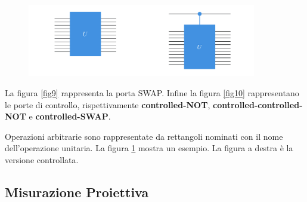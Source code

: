 \begin{figure}[h]
    \centering
    \includegraphics[width = 10cm]{./Images/ucontr.png}
    \caption{}
    \label{fig11}
\end{figure}

La figura \ref{fig9} rappresenta la porta SWAP. Infine la figura \ref{fig10} rappresentano le
porte di controllo, rispettivamente \textbf{controlled-NOT}, \textbf{controlled-controlled-NOT} e \textbf{controlled-SWAP}.

Operazioni arbitrarie sono rappresentate da rettangoli nominati con il nome dell'operazione unitaria.
La figura \ref{fig11} mostra un esempio. La figura a destra è la versione controllata.

\newpage
\subsection{Misurazione Proiettiva}